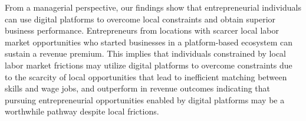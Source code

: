 \documentclass[letterpaper,12pt]{article}
\begin{document}
From a managerial perspective, our findings show that entrepreneurial individuals can use digital platforms to overcome local constraints and obtain superior business performance. Entrepreneurs from locations with scarcer local labor market opportunities who started businesses in a platform-based ecosystem can sustain a revenue premium. This implies that individuals constrained by local labor market frictions may utilize digital platforms to overcome constraints due to the scarcity of local opportunities that lead to inefficient matching between skills and wage jobs, and outperform in revenue outcomes indicating that pursuing entrepreneurial opportunities enabled by digital platforms may be a worthwhile pathway despite local frictions.








\singlespacing




\end{document}
